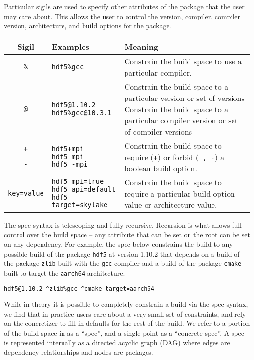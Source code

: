 Particular sigils are used to specify other attributes of the package that the user may care about. This allows the user to control the version, compiler, compiler version, architecture, and build options for the package.
\begin{tabular}{cll}
\hline
Sigil & Examples & Meaning \\
\hline
\texttt{\%} & \texttt{hdf5\%gcc} & Constrain the build space to use a particular compiler. \\
\hline
\texttt{@} & \shortstack{\texttt{hdf5@1.10.2} \\ \texttt{hdf5\%gcc@10.3.1}} & \shortstack{Constrain the build space to a particular version or set of versions \\ Constrain the build space to a particular compiler version or set of compiler versions} \\
\hline
\shortstack{\texttt{+} \\ \texttt{~} \\ \texttt{-}} & \shortstack{\texttt{hdf5+mpi} \\ \texttt{hdf5~mpi} \\ \texttt{hdf5 -mpi}} & Constrain the build space to require (\texttt{+}) or forbid (\texttt{~, -}) a boolean build option. \\
\hline
\texttt{key=value} & \shortstack{\texttt{hdf5 mpi=true} \\ \texttt{hdf5 api=default} \\ \texttt{hdf5 target=skylake}} & Constrain the build space to require a particular build option value or architecture value. \\
\end{tabular}


The spec syntax is telescoping and fully recursive.
Recursion is what allows full control over the build space -- any attribute that can be set on the root can be set on any dependency. For example, the spec below constrains the build to any possible build of the package \texttt{hdf5} at version 1.10.2 that depends on a build of the package \texttt{zlib} built with the \texttt{gcc} compiler and a build of the package \texttt{cmake} built to target the \texttt{aarch64} architecture.

\begin{verbatim}
hdf5@1.10.2 ^zlib%gcc ^cmake target=aarch64
\end{verbatim}

While in theory it is possible to completely constrain a build via the spec syntax, we find that in practice users care about a very small set of constraints, and rely on the concretizer to fill in defaults for the rest of the build. We refer to a portion of the build space in \spack as a ``spec'', and a single point as a ``concrete spec''. A spec is represented internally as a directed acyclic graph (DAG) where edges are dependency relationships and nodes are packages.


